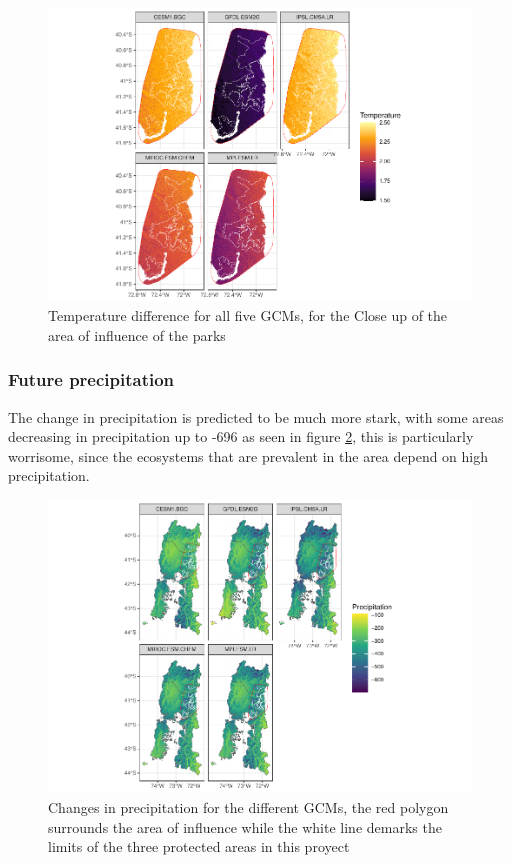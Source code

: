 \documentclass[]{article}
\begin{document}
\begin{figure}
\centering
\includegraphics{Review_and_climate_files/figure-latex/DifTempHull-1.pdf}
\caption{\label{fig:DifTempHull}Temperature difference for all five GCMs, for the Close up of the area of influence of the parks}
\end{figure}

\hypertarget{future-precipitation}{%
\subsubsection{Future precipitation}\label{future-precipitation}}

The change in precipitation is predicted to be much more stark, with some areas decreasing in precipitation up to -696 as seen in figure \ref{fig:DifPrec}, this is particularly worrisome, since the ecosystems that are prevalent in the area depend on high precipitation.

\begin{figure}
\centering
\includegraphics{Review_and_climate_files/figure-latex/DifPrec-1.pdf}
\caption{\label{fig:DifPrec}Changes in precipitation for the different GCMs, the red polygon surrounds the area of influence while the white line demarks the limits of the three protected areas in this proyect}
\end{figure}
\end{document}
